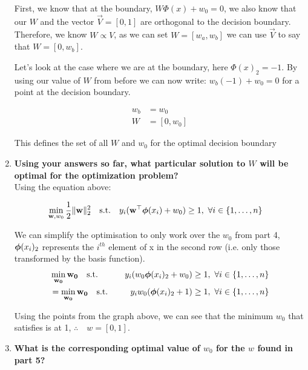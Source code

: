 \documentclass[submit]{harvardml}
\begin{document}
\begin{enumerate}
    First, we know that at the boundary, $W\Phi(x) + w_0 = 0$, we also know that our $W$ and the vector $\vec{V} = [0,1]$ are orthogonal to the decision boundary. Therefore, we know $W \propto V$, as we can set $W = [w_a, w_b]$ we can use $\vec{V}$ to say that $W = [0, w_b]$.
    
    Let's look at the case where we are at the boundary, here $\Phi(x)_2 = -1$. By using our value of $W$ from before we can now write: $w_b(-1) + w_0 = 0$ for a point at the decision boundary.
    
    \begin{align*}
        w_b &= w_0 \\
        W &= [0, w_0]
    \end{align*}
    
    This defines the set of all $W$ and $w_0$ for the optimal decision boundary
    
    \item \textbf{Using your answers so far, what particular solution to $W$ will be optimal for the optimization problem?}\\
    
    Using the equation above:
    
    \begin{align*}
        \min_{\mathbf{w}, w_0} \frac{1}{2}\|\mathbf{w}\|_2^2 \quad \text{s.t.} \quad & y_i(\mathbf{w}^\top \boldsymbol{\phi}(x_i) + w_0) \geq 1,~\forall i \in \{1,\ldots, n\}
    \end{align*}
    
    We can simplify the optimisation to only work over the $w_0$ from part 4, $\boldsymbol{\phi}(x_{i})_2$ represents the $i^{th}$ element of x in the second row (i.e. only those transformed by the basis function). 
    \begin{align*}
        &\min_{\mathbf{w_0}} \mathbf{w_0} \quad \text{s.t.} \quad & y_i(w_0 \boldsymbol{\phi}(x_{i})_2 + w_0) \geq 1,~\forall i \in \{1,\ldots, n\} \\
        &= \min_{\mathbf{w_0}} \mathbf{w_0} \quad \text{s.t.} \quad & y_i w_0 ( \boldsymbol{\phi}(x_{i})_2 + 1) \geq 1,~\forall i \in \{1,\ldots, n\} \\
    \end{align*}
    
    Using the points from the graph above, we can see that the minimum $w_0$ that satisfies is at 1, $\therefore \quad w = [0,1]$. 
    
    \item \textbf{What is the corresponding optimal value of $w_0$ for the $w$ found in part 5?}\\
    

\end{enumerate}
\end{document}
